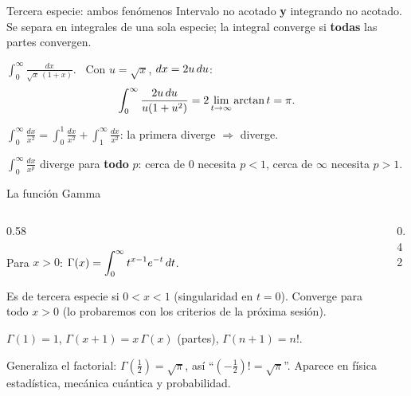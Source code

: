 \documentclass[10pt,aspectratio=169]{beamer}
\begin{document}
\begin{frame}{Tercera especie: ambos fenómenos}
  Intervalo no acotado \textbf{y} integrando no acotado. Se separa en integrales de una sola especie; la integral converge si
  \textbf{todas} las partes convergen.
  \begin{ejemplo}[10]
    $\displaystyle\int_0^\infty\frac{dx}{\sqrt x\,(1+x)}$. \ Con $u=\sqrt x$, $dx=2u\,du$:
    \[ \int_0^\infty\frac{2u\,du}{u(1+u^2)}=2\lim_{t\to\infty}\arctan t=\pi. \]
  \end{ejemplo}
  \begin{ejemplo}[11]
    $\displaystyle\int_0^\infty\frac{dx}{x^2}=\int_0^1\frac{dx}{x^2}+\int_1^\infty\frac{dx}{x^2}$: la primera diverge $\Rightarrow$ diverge.
  \end{ejemplo}
  \begin{observacion}
    $\displaystyle\int_0^\infty\frac{dx}{x^p}$ diverge para \textbf{todo} $p$: cerca de $0$ necesita $p<1$, cerca de $\infty$ necesita $p>1$.
  \end{observacion}
\end{frame}

\begin{frame}{La función Gamma}
  \begin{columns}
    \begin{column}{0.58\textwidth}
      \begin{definicion}
        Para $x>0$: \quad $\displaystyle\Gamma(x)=\int_0^\infty t^{x-1}e^{-t}\,dt$.
      \end{definicion}
      Es de tercera especie si $0<x<1$ (singularidad en $t=0$). Converge para todo $x>0$ (lo probaremos con los criterios de la
      próxima sesión).
      \begin{proposicion}
        $\Gamma(1)=1$, \quad $\Gamma(x+1)=x\,\Gamma(x)$ (partes), \quad $\Gamma(n+1)=n!$.
      \end{proposicion}
      \small Generaliza el factorial: $\Gamma\left(\frac12\right)=\sqrt\pi$, así ``$\left(-\frac12\right)!=\sqrt\pi$''. Aparece en
      física estadística, mecánica cuántica y probabilidad.
    \end{column}
    \begin{column}{0.42\textwidth}
      \centering
    \end{column}
  \end{columns}
\end{frame}
\end{document}
